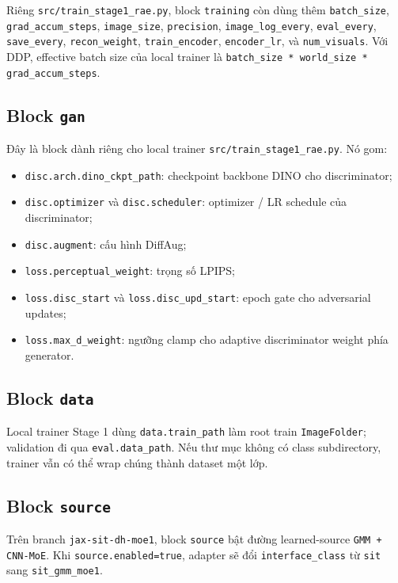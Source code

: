 Riêng \texttt{src/train\_stage1\_rae.py}, block \texttt{training} còn dùng thêm
\texttt{batch\_size}, \texttt{grad\_accum\_steps}, \texttt{image\_size}, \texttt{precision},
\texttt{image\_log\_every}, \texttt{eval\_every}, \texttt{save\_every},
\texttt{recon\_weight}, \texttt{train\_encoder}, \texttt{encoder\_lr}, và
\texttt{num\_visuals}. Với DDP, effective batch size của local trainer là
\texttt{batch\_size * world\_size * grad\_accum\_steps}.

\subsection{Block \texttt{gan}}

Đây là block dành riêng cho local trainer \texttt{src/train\_stage1\_rae.py}.
Nó gom:

\begin{itemize}[leftmargin=1.5em]
  \item \texttt{disc.arch.dino\_ckpt\_path}: checkpoint backbone DINO cho discriminator;
  \item \texttt{disc.optimizer} và \texttt{disc.scheduler}: optimizer / LR schedule của discriminator;
  \item \texttt{disc.augment}: cấu hình DiffAug;
  \item \texttt{loss.perceptual\_weight}: trọng số LPIPS;
  \item \texttt{loss.disc\_start} và \texttt{loss.disc\_upd\_start}: epoch gate cho adversarial updates;
  \item \texttt{loss.max\_d\_weight}: ngưỡng clamp cho adaptive discriminator weight phía generator.
\end{itemize}

\subsection{Block \texttt{data}}

Local trainer Stage 1 dùng \texttt{data.train\_path} làm root train
\texttt{ImageFolder}; validation đi qua \texttt{eval.data\_path}. Nếu thư mục
không có class subdirectory, trainer vẫn có thể wrap chúng thành dataset một
lớp.

\subsection{Block \texttt{source}}

Trên branch \texttt{jax-sit-dh-moe1}, block \texttt{source} bật
đường learned-source \texttt{GMM + CNN-MoE}. Khi
\texttt{source.enabled=true}, adapter sẽ đổi \texttt{interface\_class} từ
\texttt{sit} sang \texttt{sit\_gmm\_moe1}.

